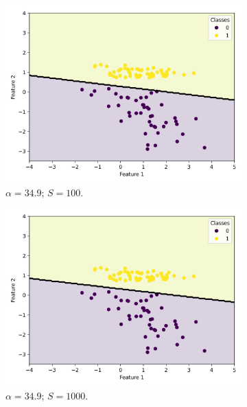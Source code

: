 \documentclass{article}
\begin{document}
\begin{figure}
\begin{subfigure}[t]{0.24\textwidth}
    \includegraphics[width=\linewidth]{scatter_predictions_with_contour_3_learning_rate_349000000_sample_100.png}
    \caption{$\alpha = 34.9$; $S = 100$.}
  \end{subfigure}
  \hfill
  \begin{subfigure}[t]{0.24\textwidth}
    \centering
    \includegraphics[width=\linewidth]{scatter_predictions_with_contour_3_learning_rate_349000000_sample_1000.png}
    \caption{$\alpha = 34.9$; $S = 1000$.}
  \end{subfigure}
  \hfill
  \begin{subfigure}[t]{0.24\textwidth}
    \centering

\end{subfigure}
\end{figure}
\end{document}
